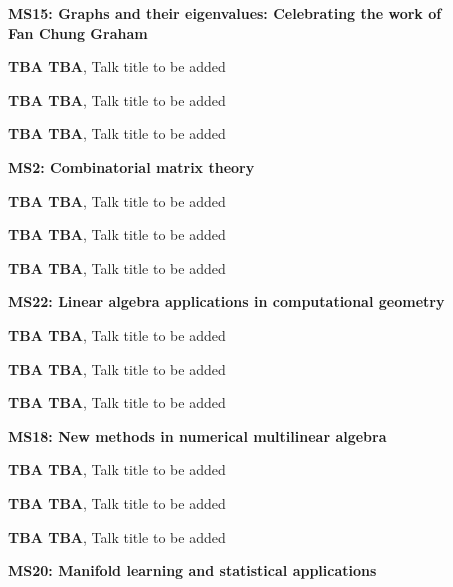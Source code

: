 \documentclass[ILAS2025-program.tex]{subfiles}
\begin{document}
\begin{description}
\begin{description}
    \item[] \textbf{MS15: Graphs and their eigenvalues: Celebrating the work of Fan Chung Graham} 
    \item[] \textbf{TBA TBA}, Talk title to be added
        \item[] \textbf{TBA TBA}, Talk title to be added
        \item[] \textbf{TBA TBA}, Talk title to be added
        \end{description}
    \begin{description}
    \item[] \textbf{MS2: Combinatorial matrix theory} 
    \item[] \textbf{TBA TBA}, Talk title to be added
        \item[] \textbf{TBA TBA}, Talk title to be added
        \item[] \textbf{TBA TBA}, Talk title to be added
        \end{description}
    \begin{description}
    \item[] \textbf{MS22: Linear algebra applications in computational geometry} 
    \item[] \textbf{TBA TBA}, Talk title to be added
        \item[] \textbf{TBA TBA}, Talk title to be added
        \item[] \textbf{TBA TBA}, Talk title to be added
        \end{description}
    \begin{description}
    \item[] \textbf{MS18: New methods in numerical multilinear algebra} 
    \item[] \textbf{TBA TBA}, Talk title to be added
        \item[] \textbf{TBA TBA}, Talk title to be added
        \item[] \textbf{TBA TBA}, Talk title to be added
        \end{description}
    \begin{description}
    \item[] \textbf{MS20: Manifold learning and statistical applications} 

\end{description}
\end{description}
\end{document}
